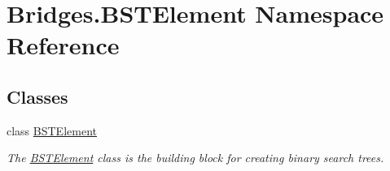 \hypertarget{namespace_bridges_1_1_b_s_t_element}{}\section{Bridges.\+B\+S\+T\+Element Namespace Reference}
\label{namespace_bridges_1_1_b_s_t_element}
\subsection*{Classes}
\begin{DoxyCompactItemize}
\item 
class \mbox{\hyperlink{class_bridges_1_1_b_s_t_element_1_1_b_s_t_element}{B\+S\+T\+Element}}
\begin{DoxyCompactList}\small\item\em The \mbox{\hyperlink{class_bridges_1_1_b_s_t_element_1_1_b_s_t_element}{B\+S\+T\+Element}} class is the building block for creating binary search trees. \end{DoxyCompactList}\end{DoxyCompactItemize}
